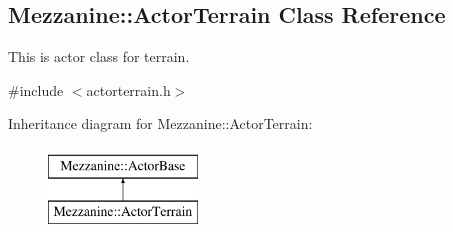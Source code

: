\hypertarget{classMezzanine_1_1ActorTerrain}{
\subsection{Mezzanine::ActorTerrain Class Reference}
\label{classMezzanine_1_1ActorTerrain}
}


This is actor class for terrain.  




{\ttfamily \#include $<$actorterrain.h$>$}

Inheritance diagram for Mezzanine::ActorTerrain:\begin{figure}[H]
\begin{center}
\leavevmode
\includegraphics[height=2.000000cm]{classMezzanine_1_1ActorTerrain}
\end{center}
\end{figure}
